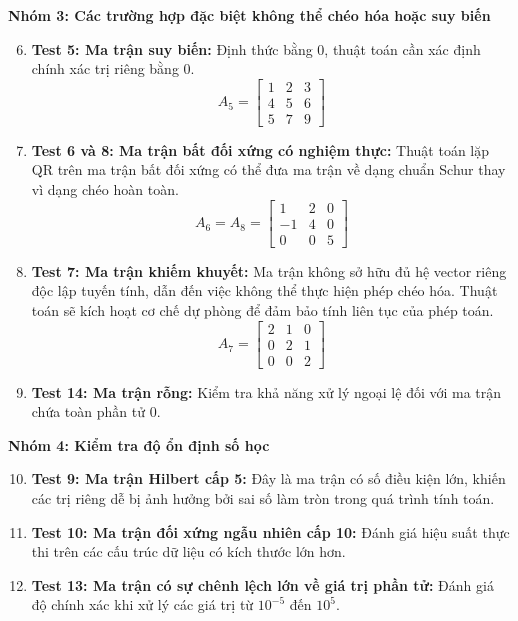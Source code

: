\textbf{Nhóm 3: Các trường hợp đặc biệt không thể chéo hóa hoặc suy biến}
\begin{enumerate}
    \setcounter{enumi}{5}
    \item \textbf{Test 5: Ma trận suy biến:} Định thức bằng 0, thuật toán cần xác định chính xác trị riêng bằng 0.
    $$ A_5 = \begin{bmatrix} 1 & 2 & 3 \\ 4 & 5 & 6 \\ 5 & 7 & 9 \end{bmatrix} $$

    \item \textbf{Test 6 và 8: Ma trận bất đối xứng có nghiệm thực:} Thuật toán lặp QR trên ma trận bất đối xứng có thể đưa ma trận về dạng chuẩn Schur thay vì dạng chéo hoàn toàn.
    $$ A_6 = A_8 = \begin{bmatrix} 1 & 2 & 0 \\ -1 & 4 & 0 \\ 0 & 0 & 5 \end{bmatrix} $$

    \item \textbf{Test 7: Ma trận khiếm khuyết:} Ma trận không sở hữu đủ hệ vector riêng độc lập tuyến tính, dẫn đến việc không thể thực hiện phép chéo hóa. Thuật toán sẽ kích hoạt cơ chế dự phòng để đảm bảo tính liên tục của phép toán.
    $$ A_7 = \begin{bmatrix} 2 & 1 & 0 \\ 0 & 2 & 1 \\ 0 & 0 & 2 \end{bmatrix} $$
    
    \item \textbf{Test 14: Ma trận rỗng:} Kiểm tra khả năng xử lý ngoại lệ đối với ma trận chứa toàn phần tử 0.
\end{enumerate}

\textbf{Nhóm 4: Kiểm tra độ ổn định số học}
\begin{enumerate}
    \setcounter{enumi}{9}
    \item \textbf{Test 9: Ma trận Hilbert cấp 5:} Đây là ma trận có số điều kiện lớn, khiến các trị riêng dễ bị ảnh hưởng bởi sai số làm tròn trong quá trình tính toán.
    \item \textbf{Test 10: Ma trận đối xứng ngẫu nhiên cấp 10:} Đánh giá hiệu suất thực thi trên các cấu trúc dữ liệu có kích thước lớn hơn.
    \item \textbf{Test 13: Ma trận có sự chênh lệch lớn về giá trị phần tử:} Đánh giá độ chính xác khi xử lý các giá trị từ $10^{-5}$ đến $10^5$.
\end{enumerate}



